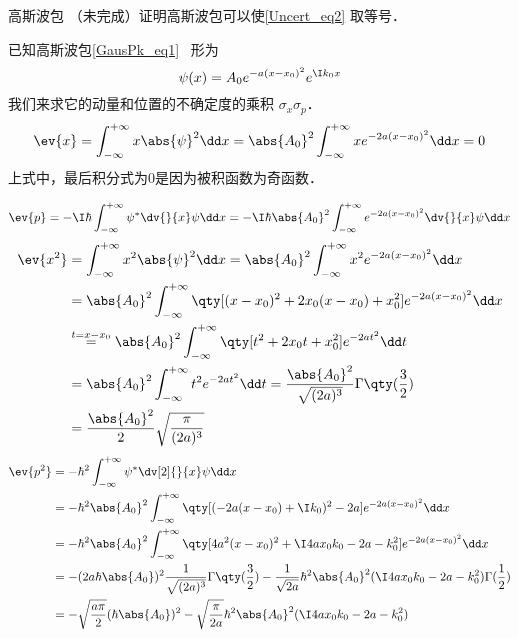 \begin{example}{高斯波包}\label{Uncert_ex1}
（未完成）证明高斯波包可以使\autoref{Uncert_eq2} 取等号．

已知高斯波包\autoref{GausPk_eq1}~ 形为
\begin{equation}
\psi(x)=A_0e^{-a(x-x_0)^2}e^{\I k_0x}
\end{equation}
我们来求它的动量和位置的不确定度的乘积 $\sigma_x\sigma_p$．
\begin{equation}
\ev{x}=\int_{-\infty}^{+\infty}x\abs{\psi}^2\dd x=\abs{A_0}^2\int_{-\infty}^{+\infty}xe^{-2a(x-x_0)^2}\dd x=0
\end{equation}
上式中，最后积分式为0是因为被积函数为奇函数．

\begin{equation}
\ev{p}=-\I\hbar\int_{-\infty}^{+\infty}\psi^{*}\dv{}{x}\psi\dd x=-\I\hbar\abs{A_0}^2\int_{-\infty}^{+\infty}e^{-2a(x-x_0)^2}\dv{}{x}\psi\dd x
\end{equation}
\begin{equation}
\begin{aligned}
\ev{x^2}&=\int_{-\infty}^{+\infty}x^2\abs{\psi}^2\dd x=\abs{A_0}^2\int_{-\infty}^{+\infty}x^2e^{-2a(x-x_0)^2}\dd x\\
&=\abs{A_0}^2\int_{-\infty}^{+\infty}\qty[(x-x_0)^2+2x_0(x-x_0)+x_0^2]e^{-2a(x-x_0)^2}\dd x\\
&\overset{t=x-x_0}{=}\abs{A_0}^2\int_{-\infty}^{+\infty}\qty[t^2+2x_0t+x_0^2]e^{-2at^2}\dd t\\
&=\abs{A_0}^2\int_{-\infty}^{+\infty}t^2e^{-2at^2}\dd t
=\frac{\abs{A_0}^2}{\sqrt{(2a)^3}}\Gamma\qty(\frac{3}{2})\\
&=\frac{\abs{A_0}^2}{2}\sqrt{\frac{\pi}{(2a)^3}}
\end{aligned}
\end{equation}
\begin{equation}
\begin{aligned}
\ev{p^2}&=-\hbar^2 \int_{-\infty}^{+\infty}\psi^{*}\dv[2]{}{x}\psi\dd x\\
&=-\hbar^2\abs{A_0}^2\int_{-\infty}^{+\infty}\qty[(-2a(x-x_0)+\I k_0)^2-2a]e^{-2a(x-x_0)^2}\dd x\\
&=-\hbar^2\abs{A_0}^2\int_{-\infty}^{+\infty}\qty[4a^2(x-x_0)^2+\I 4ax_0k_0-2a-k_0^2]e^{-2a(x-x_0)^2}\dd x\\
&=-(2a\hbar\abs{A_0})^2\frac{1}{\sqrt{(2a)^3}}\Gamma\qty(\frac{3}{2})-\frac{1}{\sqrt{2a}}\hbar^2 \abs{A_0}^2(\I 4ax_0k_0-2a-k_0^2)\Gamma(\frac{1}{2})\\
&=-\sqrt{\frac{a\pi}{2}}(\hbar\abs{A_0})^2-\sqrt{\frac{\pi}{2a}}\hbar^2 \abs{A_0}^2(\I 4ax_0k_0-2a-k_0^2)
\end{aligned}
\end{equation}

\end{example}


